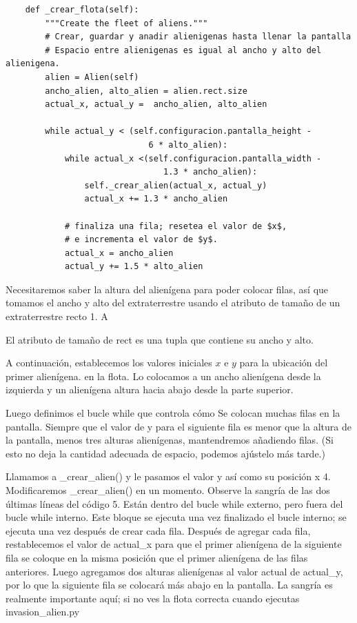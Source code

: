 \begin{lstlisting}	
    def _crear_flota(self):
        """Create the fleet of aliens."""
        # Crear, guardar y anadir alienigenas hasta llenar la pantalla
        # Espacio entre alienigenas es igual al ancho y alto del alienigena.
        alien = Alien(self)
        ancho_alien, alto_alien = alien.rect.size
        actual_x, actual_y =  ancho_alien, alto_alien

        while actual_y < (self.configuracion.pantalla_height - 
                             6 * alto_alien):
            while actual_x <(self.configuracion.pantalla_width - 
                                1.3 * ancho_alien):
                self._crear_alien(actual_x, actual_y)
                actual_x += 1.3 * ancho_alien

            # finaliza una fila; resetea el valor de $x$,
            # e incrementa el valor de $y$.
            actual_x = ancho_alien
            actual_y += 1.5 * alto_alien 
\end{lstlisting}


Necesitaremos saber la altura del alienígena para poder colocar filas, así que tomamos
el ancho y alto del extraterrestre usando el atributo de tamaño de un extraterrestre recto 1. A

El atributo de tamaño de {\ttfamily rect} es una tupla que contiene su ancho y alto.

A continuación, establecemos los valores iniciales  $x$ e $y$   para la ubicación del primer alienígena.
en la flota. Lo colocamos a un ancho alienígena desde la izquierda y un alienígena
altura hacia abajo desde la parte superior. 

Luego definimos el bucle while que controla cómo Se colocan muchas filas en la pantalla. Siempre que el valor de y para el siguiente
fila es menor que la altura de la pantalla, menos tres alturas alienígenas, mantendremos añadiendo filas. (Si esto no deja la cantidad adecuada de espacio, podemos ajústelo más tarde.)





Llamamos a {\ttfamily \_crear\_alien()} y le pasamos el valor y así como su posición x 4. Modificaremos  {\ttfamily \_crear\_alien()} en un momento.
Observe la sangría de las dos últimas líneas del código 5. Están dentro del bucle while externo, pero fuera del bucle while interno. Este bloque se ejecuta una vez finalizado el bucle interno; se ejecuta una vez después de crear cada fila. Después de agregar cada fila, restablecemos el valor de {\ttfamily actual\_x} para que el primer alienígena de la siguiente fila se coloque en la misma posición que el primer alienígena de las filas anteriores. Luego agregamos dos alturas alienígenas al valor actual de {\ttfamily actual\_y}, por lo que la siguiente fila se colocará más abajo en la pantalla. La sangría es realmente importante aquí; si no ves la flota correcta cuando ejecutas {\ttfamily invasion\_alien.py}

